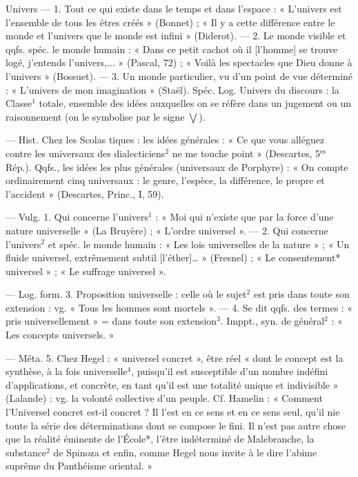 \begin{itemize}[leftmargin=1cm, label=, itemsep=1pt]
Univers\ib{} — 1. Tout ce qui existe dans
le temps et dans l’espace : « L’univers est l'ensemble de tous les êtres
créés » (Bonnet) ; « Il y a cette différence entre le monde et l'univers
que le monde est infini » (Diderot).
— 2. Le monde visible et qqfs.
spéc. le monde humain : « Dans ce
petit cachot où il [l’homme] se
trouve logé, j'entends l'univers,... »
(Pascal, 72) ; « Voilà les spectacles
que Dieu donne à l'univers » (Bossuet). — 3. Un monde particulier,
vu d’un point de vue déterminé :
« L'univers de mon imagination »
(Staël). Spéc. Log. Univers du discours : la Classe$^1$ totale, ensemble
des idées auxquelles on se réfère
dans un jugement ou un raisonnement (on le symbolise par le signe $\bigvee$).

 — Hist. Chez les Scolas
tiques : les idées générales : « Ce que
vous alléguez contre les universaux
des dialecticiens$^2$ ne me touche
point » (Descartes, 5$^\text{es}$ Rép.). Qqfs.,
les idées les plus générales (universaux de Porphyre) : « On compte
ordinairement cinq universaux : le
genre, l'espèce, la différence, le
propre et l'accident » (Descartes,
Princ., I, 59).

 — Vulg. 1. Qui concerne
l'univers$^1$ : « Moi qui n'existe que
par la force d’une nature universelle » (La Bruyère) ; « L'ordre universel ». — 2. Qui concerne l’univers$^2$ et spéc. le monde humain :
« Les lois universelles de la nature » ;
« Un fluide universel, extrêmement
subtil [l'éther]… » (Fresnel) ; « Le
consentement* universel » ; « Le
suffrage universel ».

— Log. form. 3. Proposition universelle : celle où le sujet$^2$ est pris
dans toute son extension : vg.
« Tous les hommes sont mortels ». —
4. Se dit qqfs. des termes : « pris
universellement » = dans toute son
extension$^3$. Imppt., syn. de général$^2$ :
« Les concepts universels. »

— Méta. 5. Chez Hegel : « universel concret », être réel « dont le
concept est la synthèse, à la fois
universelle$^4$, puisqu'il est susceptible d’un nombre indéfini d'applications, et concrète, en tant qu'il
est une totalité unique et indivisible » (Lalande) : vg. la volonté
collective d’un peuple. Cf. Hamelin :
« Comment l'Universel concret est-il
concret ? Il l'est en ce sens et en ce
sens seul, qu'il nie toute la série des
déterminations dont se compose le
fini. Il n’est pas autre chose que la
réalité éminente de l’École*, l'être
indéterminé de Malebranche, la
substance$^2$ de Spinoza et enfin,
comme Hegel nous invite à le dire
l’abime suprême du Panthéisme
oriental. »


\end{itemize}
